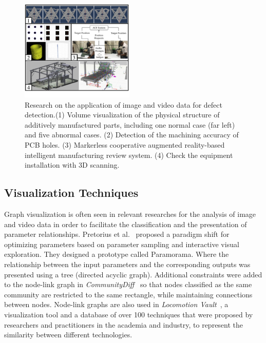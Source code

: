 \documentclass[a4paper,fleqn]{cas-dc}
\begin{document}
\begin{figure}[pos=h]
	\centering
	\includegraphics[width=0.48\textwidth]{Images/imageandvideo.pdf}
	\vspace{-2em}
	\caption{Research on the application of image and video data for defect detection.(1) Volume visualization of the physical structure of additively manufactured parts, including one normal case (far left) and five abnormal cases. (2) Detection of the machining accuracy of PCB holes. (3) Markerless cooperative augmented reality-based intelligent manufacturing review system. (4) Check the equipment installation with 3D scanning.}
	\label{fig:imageandvideo}
	\vspace{-1.5em}
\end{figure}

\subsection{Visualization Techniques}
Graph visualization is often seen in relevant researches for the analysis of image and video data in order to facilitate the classification and the presentation of parameter relationships.
Pretorius et al.~\cite{Pretorius2011} proposed a paradigm shift for optimizing parameters based on parameter sampling and interactive visual exploration. They designed a prototype called Paramorama. Where the relationship between the input parameters and the corresponding outputs was presented using a tree (directed acyclic graph).
Additional constraints were added to the node-link graph in \textit{CommunityDiff}~\cite{Emelyanova} so that nodes classified as the same community are restricted to the same rectangle, while maintaining connections between nodes.
Node-link graphs are also used in \textit{Locomotion Vault}~\cite{Luca2021}, a visualization tool and a database of over 100 techniques that were proposed by researchers and practitioners in the academia and industry, to represent the similarity between different technologies.
\end{document}
